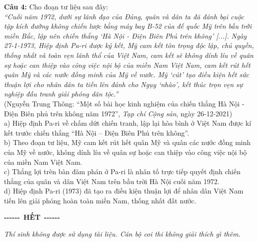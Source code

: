 \documentclass[12pt,a4paper]{article}
\begin{document}
\noindent \textbf{Câu 4:} Cho đoạn tư liệu sau đây:\\
\textit{``Cuối năm 1972, dưới sự lãnh đạo của Đảng, quân và dân ta đã đánh bại cuộc tập kích đường không chiến lược bằng máy bay B-52 của đế quốc Mỹ trên bầu trời miền Bắc, lập nên chiến thắng `Hà Nội - Điện Biên Phủ trên không' [...]. Ngày 27-1-1973, Hiệp định Pa-ri được ký kết, Mỹ cam kết tôn trọng độc lập, chủ quyền, thống nhất và toàn vẹn lãnh thổ của Việt Nam, cam kết sẽ không dính líu về quân sự hoặc can thiệp vào công việc nội bộ của miền Nam Việt Nam, cam kết rút hết quân Mỹ và các nước đồng minh của Mỹ về nước. Mỹ `cút' tạo điều kiện hết sức thuận lợi cho nhân dân ta tiến lên đánh cho Ngụy `nhào', kết thúc trọn vẹn sự nghiệp đấu tranh giải phóng dân tộc.''}\\
\hspace*{\fill}(Nguyễn Trung Thông: ``Một số bài học kinh nghiệm của chiến thắng Hà Nội - Điện Biên phủ trên không năm 1972'', \textit{Tạp chí Cộng sản}, ngày 26-12-2021)\\
\noindent a) Hiệp định Pa-ri về chấm dứt chiến tranh, lập lại hòa bình ở Việt Nam được kí kết trước chiến thắng ``Hà Nội -- Điện Biên Phủ trên không''.\\


\noindent b) Theo đoạn tư liệu, Mỹ cam kết rút hết quân Mỹ và quân các nước đồng minh của Mỹ về nước, không dính líu về quân sự hoặc can thiệp vào công việc nội bộ của miền Nam Việt Nam.\\


\noindent c) Thắng lợi trên bàn đàm phán ở Pa-ri là nhân tố trực tiếp quyết định chiến thắng của quân và dân Việt Nam trên bầu trời Hà Nội cuối năm 1972.\\


\noindent d) Hiệp định Pa-ri (1973) đã tạo ra điều kiện thuận lợi để nhân dân Việt Nam tiến lên giải phóng hoàn toàn miền Nam, thống nhất đất nước.\vspace{0.6cm}
\begin{center}
{\bfseries -{}-{}-{}-{}-{}-}\ \textbf{HẾT}\ {\bfseries -{}-{}-{}-{}-{}-}
\end{center}
\vspace{0.15cm}
{\small\itshape
Thí sinh không được sử dụng tài liệu. Cán bộ coi thi không giải thích gì thêm.}
\end{document}
